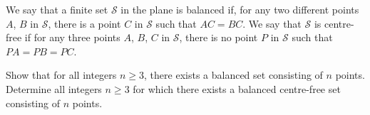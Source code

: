 \begin{problem}
We say that a finite set $\mathcal{S}$ in the plane is balanced if, for any two different points $A$, $B$ in $\mathcal{S}$, there is a point $C$ in $\mathcal{S}$ such that $AC=BC$. We say that $\mathcal{S}$ is centre-free if for any three points $A$, $B$, $C$ in $\mathcal{S}$, there is no point $P$ in $\mathcal{S}$ such that $PA=PB=PC$.

Show that for all integers $n\geq 3$, there exists a balanced set consisting of $n$ points.
Determine all integers $n\geq 3$ for which there exists a balanced centre-free set consisting of $n$ points.

\end{problem}

%

